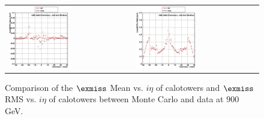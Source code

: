 \begin{figure}[h!]
 \centering
 \begin{tabular}{ll}
  \includegraphics[width=0.5\textwidth]{plots_DataVsMC_MB_900GeV/g_calometPxMean_vs_ieta_900.eps} &
  \includegraphics[width=0.5\textwidth]{plots_DataVsMC_MB_900GeV/g_calometPxRMS_vs_ieta_900.eps} \\
 \end{tabular}
 \caption{\small Comparison of the $\exmiss$ Mean vs. $i\eta$ of calotowers and $\exmiss$ RMS vs. $i\eta$ of calotowers between 
          Monte Carlo and data at $900$ GeV.\label{fig:METx_MeanRMS_vs_ieta_900}}
\end{figure}

